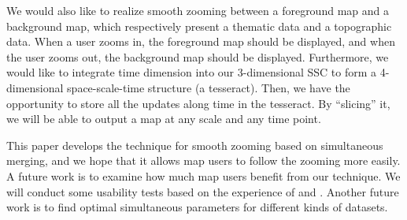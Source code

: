 \documentclass[twocolumn]{svjour3}          %
\begin{document}
We would also like to realize smooth zooming
between a foreground map and a background map,
which respectively present a thematic data and a topographic data.
When a user zooms in, the foreground map should be displayed,
and when the user zooms out,
the background map should be displayed.
Furthermore, we would like to 
integrate time dimension into our 3-dimensional SSC
to form a 4-dimensional space-scale-time structure (a tesseract).
Then, we have the opportunity to store all the updates along time in the tesseract.
By ``slicing'' it, we will be able to output a map at any scale and any time point.


This paper develops the technique for smooth zooming based on simultaneous merging,
and we hope that it allows map users to follow the zooming more easily.
A future work is to examine 
how much map users benefit from our technique.
We will conduct some usability tests based on the experience of
\citet[]{Suba2017Thesis} and \citet{Midtbo2007}.
Another future work is to find optimal simultaneous parameters for 
different kinds of datasets.















%
\end{document}
